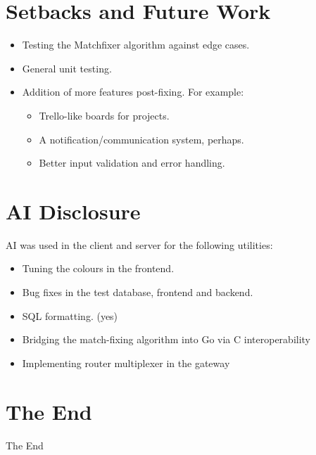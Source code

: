 \documentclass[12pt, aspectratio=169]{beamer}
\begin{document}
\section{Setbacks and Future Work}

\begin{frame}{\insertsection}
\begin{itemize}
  \item Testing the Matchfixer algorithm against edge cases.
  \item General unit testing.
  \item Addition of more features post-fixing. For example:
    \begin{itemize}
      \item Trello-like boards for projects.
      \item A notification/communication system, perhaps.
      \item Better input validation and error handling.
    \end{itemize}
\end{itemize}
\end{frame}

\section*{AI Disclosure}

\begin{frame}{\insertsection}
AI was used in the client and server for the following
utilities:
\begin{itemize}
  \item Tuning the colours in the frontend.
  \item Bug fixes in the test database, frontend and backend.
  \item SQL formatting. (yes)
  \item Bridging the match-fixing algorithm into Go via C interoperability
  \item Implementing router multiplexer in the gateway
\end{itemize}
\end{frame}

\section*{The End}

\begin{frame}
\centering
The End
\end{frame}
\end{document}
